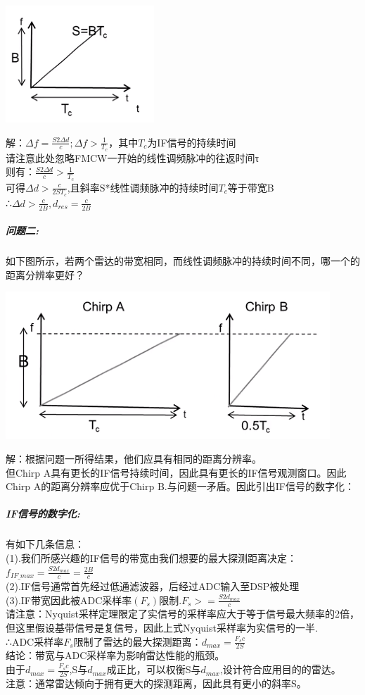 \documentclass[UTF8]{ctexart}
\begin{document}
{\centering \includegraphics[width = .3\textwidth]{pic/problem_1.png}

}
解：\(\Delta f=\frac{S2\Delta d}{c};\Delta f>\frac{1}{T_c} \)，其中$T_c$为IF信号的持续时间\\
请注意此处忽略FMCW一开始的线性调频脉冲的往返时间τ\\
则有：$\frac{S2\Delta d}{c}>\frac{1}{T_c}$\\
可得$\Delta d>\frac{c}{2ST_c}$,且斜率S*线性调频脉冲的持续时间$T_c$等于带宽B\\
∴$\Delta d>\frac{c}{2B},d_{res}=\frac{c}{2B}$\\
\subparagraph{问题二:}如下图所示，若两个雷达的带宽相同，而线性调频脉冲的持续时间不同，哪一个的距离分辨率更好？\\
{\centering \includegraphics[width = .35\textwidth]{pic/problem_2.png}

}
解：根据问题一所得结果，他们应具有相同的距离分辨率。\\
但Chirp A具有更长的IF信号持续时间，因此具有更长的IF信号观测窗口。因此Chirp A的距离分辨率应优于Chirp B.与问题一矛盾。因此引出IF信号的数字化：
\subparagraph{IF信号的数字化:}有如下几条信息：\\
(1).我们所感兴趣的IF信号的带宽由我们想要的最大探测距离决定：\(f_{IF\_max}=\frac{S2d_{max}}{c}=\frac{2B}{c}\)\\
(2).IF信号通常首先经过低通滤波器，后经过ADC输入至DSP被处理\\
(3).IF带宽因此被ADC采样率$(F_s)$限制.\(F_s >= \frac{S2d_{max}}{c}\)\\
请注意：Nyquist采样定理限定了实信号的采样率应大于等于信号最大频率的2倍，但这里假设基带信号是复信号，因此上式Nyquist采样率为实信号的一半.\\
∴ADC采样率$F_s$限制了雷达的最大探测距离：\(d_{max}=\frac{F_sc}{2S}\)\\
结论：带宽与ADC采样率为影响雷达性能的瓶颈。\\
由于$d_{max}=\frac{F_sc}{2S}$,S与$d_{max}$成正比，可以权衡S与$d_{max}$,设计符合应用目的的雷达。\\
注意：通常雷达倾向于拥有更大的探测距离，因此具有更小的斜率S。
\end{document}
